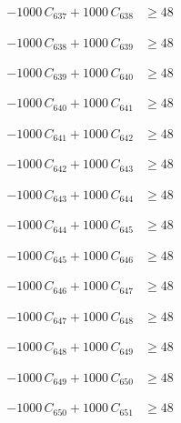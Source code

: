 \documentclass[a4paper,11pt]{article}
\begin{document}
\begin{align}
-1000\,C_{637} + 1000\,C_{638} &\geq 48 \nonumber
\end{align}

\begin{align}
-1000\,C_{638} + 1000\,C_{639} &\geq 48 \nonumber
\end{align}

\begin{align}
-1000\,C_{639} + 1000\,C_{640} &\geq 48 \nonumber
\end{align}

\begin{align}
-1000\,C_{640} + 1000\,C_{641} &\geq 48 \nonumber
\end{align}

\begin{align}
-1000\,C_{641} + 1000\,C_{642} &\geq 48 \nonumber
\end{align}

\begin{align}
-1000\,C_{642} + 1000\,C_{643} &\geq 48 \nonumber
\end{align}

\begin{align}
-1000\,C_{643} + 1000\,C_{644} &\geq 48 \nonumber
\end{align}

\begin{align}
-1000\,C_{644} + 1000\,C_{645} &\geq 48 \nonumber
\end{align}

\begin{align}
-1000\,C_{645} + 1000\,C_{646} &\geq 48 \nonumber
\end{align}

\begin{align}
-1000\,C_{646} + 1000\,C_{647} &\geq 48 \nonumber
\end{align}

\begin{align}
-1000\,C_{647} + 1000\,C_{648} &\geq 48 \nonumber
\end{align}

\begin{align}
-1000\,C_{648} + 1000\,C_{649} &\geq 48 \nonumber
\end{align}

\begin{align}
-1000\,C_{649} + 1000\,C_{650} &\geq 48 \nonumber
\end{align}

\begin{align}
-1000\,C_{650} + 1000\,C_{651} &\geq 48 \nonumber
\end{align}
\end{document}
